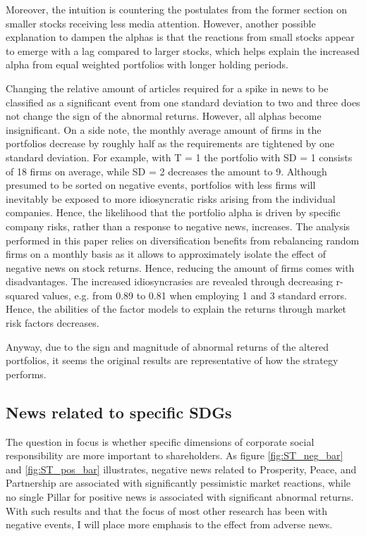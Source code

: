 Moreover, the intuition is countering the postulates from the former section on smaller stocks receiving less media attention. However, another possible explanation to dampen the alphas is that the reactions from small stocks appear to emerge with a lag compared to larger stocks, which helps explain the increased alpha from equal weighted portfolios with longer holding periods. 


Changing the relative amount of articles required for a spike in news to be classified as a significant event from one standard deviation to two and three does not change the sign of the abnormal returns. However, all alphas become insignificant. On a side note, the monthly average amount of firms in the portfolios decrease by roughly half as the requirements are tightened by one standard deviation. For example, with T = 1 the portfolio with SD = 1 consists of 18 firms on average, while SD = 2 decreases the amount to 9. Although presumed to be sorted on negative events, portfolios with less firms will inevitably be exposed to more idiosyncratic risks arising from the individual companies. Hence, the likelihood that the portfolio alpha is driven by specific company risks, rather than a response to negative news, increases. The analysis performed in this paper relies on diversification benefits from rebalancing random firms on a monthly basis as it allows to approximately isolate the effect of negative news on stock returns. Hence, reducing the amount of firms comes with disadvantages. The increased idiosyncrasies are revealed through decreasing r-squared values, e.g. from 0.89 to 0.81 when employing 1 and 3 standard errors. Hence, the abilities of the factor models to explain the returns through market risk factors decreases. 

Anyway, due to the sign and magnitude of abnormal returns of the altered portfolios, it seems the original results are representative of how the strategy performs. 


\subsection{News related to specific SDGs}

The question in focus is whether specific dimensions of corporate social responsibility are more important to shareholders. As figure \ref{fig:ST_neg_bar} and \ref{fig:ST_pos_bar} illustrates, negative news related to Prosperity, Peace, and Partnership are associated with significantly pessimistic market reactions, while no single Pillar for positive news is associated with significant abnormal returns. With such results and that the focus of most other research has been with negative events, I will place more emphasis to the effect from adverse news.

